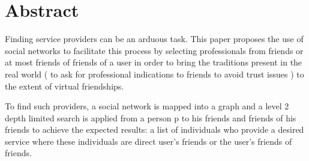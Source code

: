 

\chapter{Abstract}\label{sec:abstract}
Finding service providers can be an arduous task. This paper proposes the use of social networks to facilitate this process by selecting professionals from friends or at most friends of friends of a user in order to bring the traditions present in the real world ( to ask for professional indications to friends to avoid trust issues ) to the extent of virtual friendships.

To find such providers, a social network is mapped into a graph and a level 2 depth limited search is applied from a person p to his friends and friends of his friends to achieve the expected results: a list of individuals who provide a desired service where these individuals are direct user's friends or the user's friends of friends.
